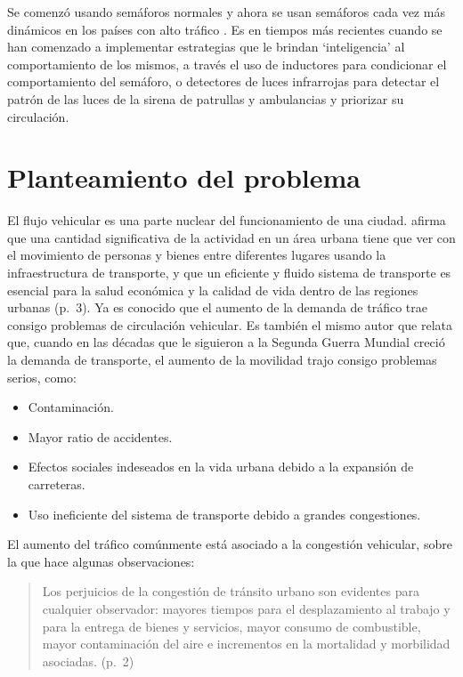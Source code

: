 Se comenzó usando semáforos normales y ahora se usan semáforos cada vez
más dinámicos en los países con alto tráfico . Es en tiempos más
recientes cuando se han comenzado a implementar estrategias que le
brindan `inteligencia' al comportamiento de los mismos, a través el uso
de inductores para condicionar el comportamiento del semáforo, o
detectores de luces infrarrojas para detectar el patrón de las luces de
la sirena de patrullas y ambulancias y priorizar su circulación.

\hypertarget{planteamiento-del-problema}{%
\section{Planteamiento del problema}\label{planteamiento-del-problema}}

El flujo vehicular es una parte nuclear del funcionamiento de una
ciudad. \parencite[3]{Patriksson2012} afirma que una cantidad
significativa de la actividad en un área urbana tiene que ver con el
movimiento de personas y bienes entre diferentes lugares usando la
infraestructura de transporte, y que un eficiente y fluido sistema de
transporte es esencial para la salud económica y la calidad de vida
dentro de las regiones urbanas (p.~3). Ya es conocido que el aumento de
la demanda de tráfico trae consigo problemas de circulación vehicular.
Es también el mismo autor que relata que, cuando en las décadas que le
siguieron a la Segunda Guerra Mundial creció la demanda de transporte,
el aumento de la movilidad trajo consigo problemas serios, como:

\begin{itemize}
\item
  Contaminación.
\item
  Mayor ratio de accidentes.
\item
  Efectos sociales indeseados en la vida urbana debido a la expansión de
  carreteras.
\item
  Uso ineficiente del sistema de transporte debido a grandes
  congestiones.
\end{itemize}

El aumento del tráfico comúnmente está asociado a la congestión
vehicular, sobre la que \parencite{Medina-Durango2011} hace algunas
observaciones:

\begin{quote}
Los perjuicios de la congestión de tránsito urbano son evidentes para
cualquier observador: mayores tiempos para el desplazamiento al trabajo
y para la entrega de bienes y servicios, mayor consumo de combustible,
mayor contaminación del aire e incrementos en la mortalidad y morbilidad
asociadas. (p.~2)
\end{quote}

